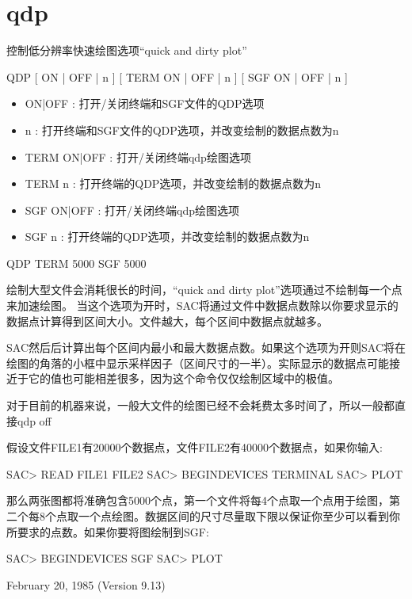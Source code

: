 \section{qdp}
\label{cmd:qdp}

控制低分辨率快速绘图选项``quick and dirty plot''

QDP [ ON | OFF | n ] [ TERM ON | OFF | n ] [ SGF ON | OFF | n ]

\begin{itemize}
\item ON|OFF : 打开/关闭终端和SGF文件的QDP选项 
\item n : 打开终端和SGF文件的QDP选项，并改变绘制的数据点数为n 
\item TERM ON|OFF : 打开/关闭终端qdp绘图选项 
\item TERM n : 打开终端的QDP选项，并改变绘制的数据点数为n 
\item SGF ON|OFF : 打开/关闭终端qdp绘图选项 
\item SGF n : 打开终端的QDP选项，并改变绘制的数据点数为n 
\end{itemize}

QDP TERM 5000 SGF 5000

绘制大型文件会消耗很长的时间，``quick and dirty plot''选项通过不绘制每一个点来加速绘图。
当这个选项为开时，SAC将通过文件中数据点数除以你要求显示的数据点计算得到区间大小。文件越大，每个区间中数据点就越多。

SAC然后后计算出每个区间内最小和最大数据点数。如果这个选项为开则SAC将在绘图的角落的小框中显示采样因子（区间尺寸的一半）。实际显示的数据点可能接近于它的值也可能相差很多，因为这个命令仅仅绘制区域中的极值。

对于目前的机器来说，一般大文件的绘图已经不会耗费太多时间了，所以一般都直接qdp off

假设文件FILE1有20000个数据点，文件FILE2有40000个数据点，如果你输入:
\begin{SACCode}
SAC> READ FILE1 FILE2
SAC> BEGINDEVICES TERMINAL
SAC> PLOT
\end{SACCode}
那么两张图都将准确包含5000个点，第一个文件将每4个点取一个点用于绘图，第二个每8个点取一个点绘图。数据区间的尺寸尽量取下限以保证你至少可以看到你所要求的点数。如果你要将图绘制到SGF:
\begin{SACCode}
SAC> BEGINDEVICES SGF
SAC> PLOT
\end{SACCode}

February 20, 1985 (Version 9.13)
